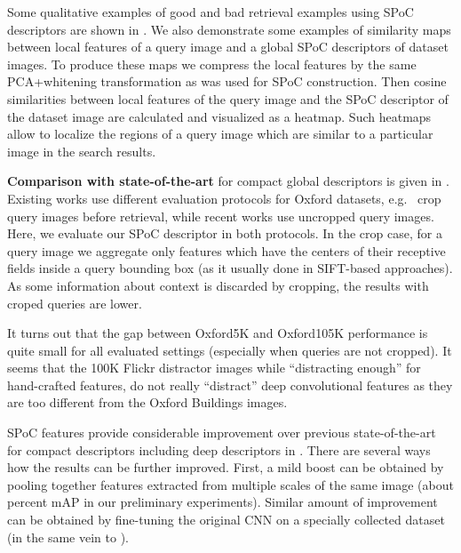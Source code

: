 Some qualitative examples of good and bad retrieval examples using SPoC descriptors are shown in . We also demonstrate some examples of similarity maps between local features of a query image and a global SPoC descriptors of dataset images. To produce these maps we compress the local features by the same PCA+whitening transformation as was used for SPoC construction. Then cosine similarities between local features of the query image and the SPoC descriptor of the dataset image are calculated and visualized as a heatmap. Such heatmaps allow to localize the regions of a query image which are similar to a particular image in the search results. 

{\bf Comparison with state-of-the-art} for compact global descriptors is given in . Existing works use different evaluation protocols for Oxford datasets, e.g.~\cite{Jegou14,Tolias13} crop query images before retrieval, while recent works \cite{Razavian15,Babenko14,Azizpour14,Razavian14} use uncropped query images. Here, we evaluate our SPoC descriptor in both protocols. In the crop case, for a query image we aggregate only features which have the centers of their receptive fields inside a query bounding box (as it usually done in SIFT-based approaches). As some information about context is discarded by cropping, the results with croped queries are lower.

It turns out that the gap between Oxford5K and Oxford105K performance is quite small for all evaluated settings (especially when queries are not cropped). It seems that the 100K Flickr distractor images while ``distracting enough'' for hand-crafted features, do not really ``distract'' deep convolutional features as they are too different from the Oxford Buildings images.

SPoC features provide considerable improvement over previous state-of-the-art for compact descriptors including deep descriptors in \cite{Babenko14, Gong14, Razavian15}. There are several ways how the results can be further improved. First, a mild boost can be obtained by pooling together features extracted from multiple scales of the same image (about  percent mAP in our preliminary experiments). Similar amount of improvement can be obtained by fine-tuning the original CNN on a specially collected dataset (in the same vein to \cite{Babenko14}). 



